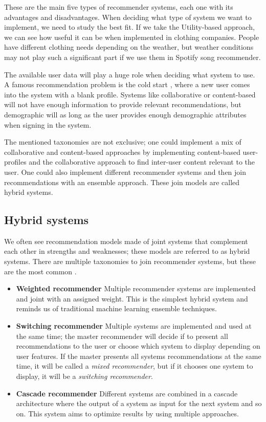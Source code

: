 \documentclass{kththesis}
\begin{document}
These are the main five types of recommender systems, each one with its advantages and disadvantages. When deciding what type of system we want to implement, we need to study the best fit. If we take the Utility-based approach, we can see how useful it can be when implemented in clothing companies. People have different clothing needs depending on the weather, but weather conditions may not play such a significant part if we use them in Spotify song recommender.

The available user data will play a huge role when deciding what system to use. A famous recommendation problem is the cold start \cite{coldstart}, where a new user comes into the system with a blank profile. Systems like collaborative or content-based will not have enough information to provide relevant recommendations, but demographic will as long as the user provides enough demographic attributes when signing in the system.

The mentioned taxonomies are not exclusive; one could implement a mix of collaborative and content-based approaches by implementing content-based user-profiles and the collaborative approach to find inter-user content relevant to the user. One could also implement different recommender systems and then join recommendations with an ensemble approach. These join models are called hybrid systems.

\subsection{Hybrid systems}
We often see recommendation models made of joint systems that complement each other in strengths and weaknesses; these models are referred to as hybrid systems. There are multiple taxonomies to join recommender systems, but these are the most common \cite{Burke_hybrid}.

\begin{itemize}
    \item \textbf{Weighted recommender} Multiple recommender systems are implemented and joint with an assigned weight. This is the simplest hybrid system and reminds us of traditional machine learning ensemble techniques.
    
    \item \textbf{Switching recommender} Multiple systems are implemented and used at the same time; the master recommender will decide if to present all recommendations to the user or choose which system to display depending on user features. If the master presents all systems recommendations at the same time, it will be called a \textit{mixed recommender}, but if it chooses one system to display, it will be a \textit{switching recommender}.
    \item \textbf{Cascade recommender} Different systems are combined in a cascade architecture where the output of a system as input for the next system and so on. This system aims to optimize results by using multiple approaches.
\end{itemize}
\end{document}

